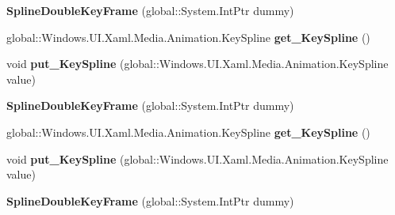\begin{DoxyCompactItemize}
{\bfseries Spline\+Double\+Key\+Frame} (global\+::\+System.\+Int\+Ptr dummy)
\item 
\mbox{\label{class_windows_1_1_u_i_1_1_xaml_1_1_media_1_1_animation_1_1_spline_double_key_frame_a284de7793c5aad4546113d30eb113e57}} 
global\+::\+Windows.\+U\+I.\+Xaml.\+Media.\+Animation.\+Key\+Spline {\bfseries get\+\_\+\+Key\+Spline} ()
\item 
\mbox{\label{class_windows_1_1_u_i_1_1_xaml_1_1_media_1_1_animation_1_1_spline_double_key_frame_a00a313d5fe9408d85eb21a8359970b9b}} 
void {\bfseries put\+\_\+\+Key\+Spline} (global\+::\+Windows.\+U\+I.\+Xaml.\+Media.\+Animation.\+Key\+Spline value)
\item 
\mbox{\label{class_windows_1_1_u_i_1_1_xaml_1_1_media_1_1_animation_1_1_spline_double_key_frame_a5682fdd40fc6dfc76492bfe4adbfd6ec}} 
{\bfseries Spline\+Double\+Key\+Frame} (global\+::\+System.\+Int\+Ptr dummy)
\item 
\mbox{\label{class_windows_1_1_u_i_1_1_xaml_1_1_media_1_1_animation_1_1_spline_double_key_frame_a284de7793c5aad4546113d30eb113e57}} 
global\+::\+Windows.\+U\+I.\+Xaml.\+Media.\+Animation.\+Key\+Spline {\bfseries get\+\_\+\+Key\+Spline} ()
\item 
\mbox{\label{class_windows_1_1_u_i_1_1_xaml_1_1_media_1_1_animation_1_1_spline_double_key_frame_a00a313d5fe9408d85eb21a8359970b9b}} 
void {\bfseries put\+\_\+\+Key\+Spline} (global\+::\+Windows.\+U\+I.\+Xaml.\+Media.\+Animation.\+Key\+Spline value)
\item 
\mbox{\label{class_windows_1_1_u_i_1_1_xaml_1_1_media_1_1_animation_1_1_spline_double_key_frame_a5682fdd40fc6dfc76492bfe4adbfd6ec}} 
{\bfseries Spline\+Double\+Key\+Frame} (global\+::\+System.\+Int\+Ptr dummy)
\item 
\mbox{\label{class_windows_1_1_u_i_1_1_xaml_1_1_media_1_1_animation_1_1_spline_double_key_frame_a284de7793c5aad4546113d30eb113e57}} 

\end{DoxyCompactItemize}
